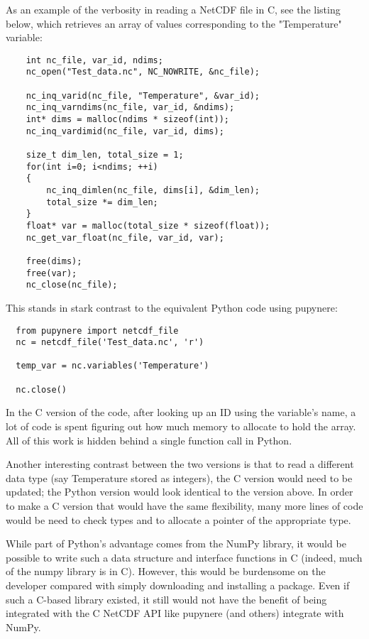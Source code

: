 \documentclass[twocolumn]{article}
\begin{document}
As an example of the verbosity in reading a NetCDF file in C, see the listing
below, which retrieves an array of values corresponding to the "Temperature"
variable:

  \lstset{language=C}
  \begin{lstlisting}
    int nc_file, var_id, ndims;
    nc_open("Test_data.nc", NC_NOWRITE, &nc_file);

    nc_inq_varid(nc_file, "Temperature", &var_id);
    nc_inq_varndims(nc_file, var_id, &ndims);
    int* dims = malloc(ndims * sizeof(int));
    nc_inq_vardimid(nc_file, var_id, dims);

    size_t dim_len, total_size = 1;
    for(int i=0; i<ndims; ++i)
    {
        nc_inq_dimlen(nc_file, dims[i], &dim_len);
        total_size *= dim_len;
    }
    float* var = malloc(total_size * sizeof(float));
    nc_get_var_float(nc_file, var_id, var);
 
    free(dims);
    free(var);
    nc_close(nc_file);
  \end{lstlisting}
This stands in stark contrast to the equivalent Python code using pupynere:
  \lstset{language=Python}
  \begin{lstlisting}
  from pupynere import netcdf_file
  nc = netcdf_file('Test_data.nc', 'r')

  temp_var = nc.variables('Temperature')

  nc.close()
  \end{lstlisting}
In the C version of the code, after looking up an ID using the variable's name,
a lot of code is spent figuring out how much memory to allocate to hold the
array.  All of this work is hidden behind a single function call in Python.

Another interesting contrast between the two versions is that to read a different
data type (say Temperature stored as integers), the C version would need to be
updated; the Python version would look identical to the version above. In order
to make a C version that would have the same flexibility, many more lines of
code would be need to check types and to allocate a pointer of the appropriate
type.

While part of Python's advantage comes from  the NumPy library, it would
be possible to write such a data structure and interface functions in C (indeed,
much of the numpy library is in C). However, this would be burdensome on the developer
compared with simply downloading and installing a package. Even if such a C-based
library existed, it still would not have the benefit of being integrated with
the C NetCDF API like pupynere (and others) integrate with NumPy.
\end{document}
